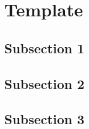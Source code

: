 \section{Template}
\label{sectionX} %
\renewcommand*{\runninghead}{\nameref{sectionX}} %


\clearpage


\subsection{Subsection 1}


\clearpage


\subsection{Subsection 2}


\clearpage


\subsection{Subsection 3}


\clearpage

